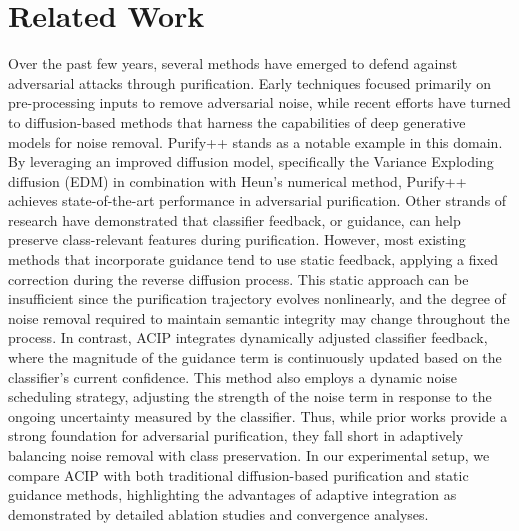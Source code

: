 \documentclass{article} %
\begin{document}
\section{Related Work}
\label{sec:related}
Over the past few years, several methods have emerged to defend against adversarial attacks through purification. Early techniques focused primarily on pre-processing inputs to remove adversarial noise, while recent efforts have turned to diffusion-based methods that harness the capabilities of deep generative models for noise removal. Purify++ stands as a notable example in this domain. By leveraging an improved diffusion model, specifically the Variance Exploding diffusion (EDM) in combination with Heun's numerical method, Purify++ achieves state-of-the-art performance in adversarial purification. Other strands of research have demonstrated that classifier feedback, or guidance, can help preserve class-relevant features during purification. However, most existing methods that incorporate guidance tend to use static feedback, applying a fixed correction during the reverse diffusion process. This static approach can be insufficient since the purification trajectory evolves nonlinearly, and the degree of noise removal required to maintain semantic integrity may change throughout the process. In contrast, ACIP integrates dynamically adjusted classifier feedback, where the magnitude of the guidance term is continuously updated based on the classifier's current confidence. This method also employs a dynamic noise scheduling strategy, adjusting the strength of the noise term in response to the ongoing uncertainty measured by the classifier. Thus, while prior works provide a strong foundation for adversarial purification, they fall short in adaptively balancing noise removal with class preservation. In our experimental setup, we compare ACIP with both traditional diffusion-based purification and static guidance methods, highlighting the advantages of adaptive integration as demonstrated by detailed ablation studies and convergence analyses.
\end{document}
